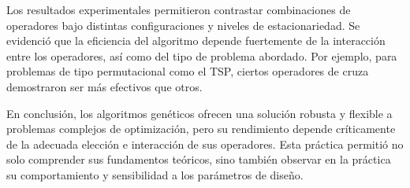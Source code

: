 \documentclass[12pt,twoside]{report}
\begin{document}
	Los resultados experimentales permitieron contrastar combinaciones de operadores bajo distintas configuraciones y niveles de estacionariedad. Se evidenció que la eficiencia del algoritmo depende fuertemente de la interacción entre los operadores, así como del tipo de problema abordado. Por ejemplo, para problemas de tipo permutacional como el TSP, ciertos operadores de cruza demostraron ser más efectivos que otros.
	
	En conclusión, los algoritmos genéticos ofrecen una solución robusta y flexible a problemas complejos de optimización, pero su rendimiento depende críticamente de la adecuada elección e interacción de sus operadores. Esta práctica permitió no solo comprender sus fundamentos teóricos, sino también observar en la práctica su comportamiento y sensibilidad a los parámetros de diseño.
	
	
	
	\clearpage
	
	
	
\end{document}
